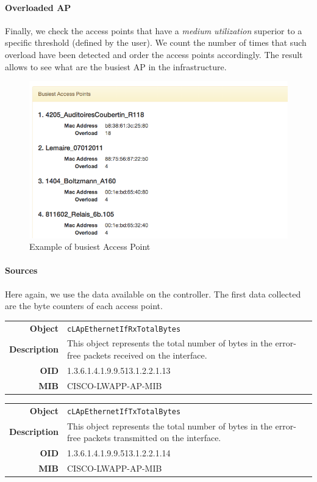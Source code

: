 \paragraph*{Overloaded AP} Finally, we check the access points that have a \emph{medium utilization} superior to a specific threshold (defined by the user). We count the number of times that such overload have been detected and order the access points accordingly. The result allows to see what are the busiest AP in the infrastructure.
\begin{figure}[H]
   \includegraphics[width=\textwidth]{Pictures/chapter5/busiestAP.png}
   \caption{Example of busiest Access Point}
\end{figure}

\paragraph*{Sources} Here again, we use the data available on the controller. The first data collected are the byte counters of each access point.

\begin{tabular}{|r l|}
\hline
\textbf{Object} & \texttt{cLApEthernetIfRxTotalBytes} \\
\textbf{Description} & \parbox{11cm}{This object represents the total number of bytes in the error-free packets received on the interface.} \\
\textbf{OID} & 1.3.6.1.4.1.9.9.513.1.2.2.1.13 \\
\textbf{MIB} & CISCO-LWAPP-AP-MIB \\
\hline
\end{tabular}

\begin{tabular}{|r l|}
\hline
\textbf{Object} & \texttt{cLApEthernetIfTxTotalBytes} \\
\textbf{Description} & \parbox{11cm}{This object represents the total number of bytes in the error-free packets transmitted on the interface.} \\
\textbf{OID} & 1.3.6.1.4.1.9.9.513.1.2.2.1.14 \\
\textbf{MIB} & CISCO-LWAPP-AP-MIB \\
\hline
\end{tabular}

